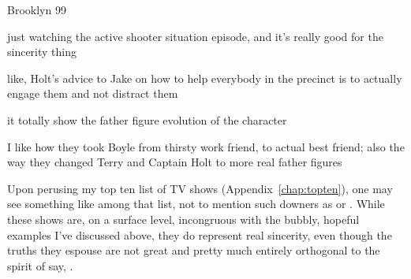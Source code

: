 \documentclass[../butidigress.tex]{subfiles}
\begin{document}



\begin{somenotes}{Brooklyn 99}
    \item just watching the active shooter situation episode, and it's really good for the sincerity thing
    \item like, Holt's advice to Jake on how to help everybody in the precinct is to actually engage them and not distract them
    \item it totally show the father figure evolution of the character
    \item I like how they took Boyle from thirsty work friend, to actual best friend; also the way they changed Terry and Captain Holt to more real father figures
\end{somenotes}

Upon perusing my top ten list of TV shows (Appendix~\ref{chap:topten}), one may see something like  among that list, not to mention such downers as  or .
While these shows are, on a surface level, incongruous with the bubbly, hopeful examples I've discussed above, they do represent real sincerity, even though the truths they espouse are not great and pretty much entirely orthogonal to the spirit of say, .
\end{document}
